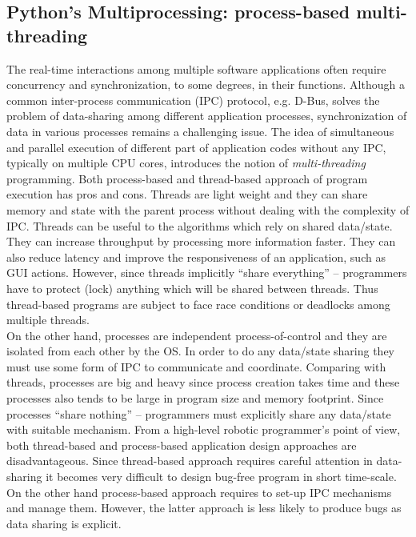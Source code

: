 \subsection{Python's Multiprocessing: process-based multi-threading}
\label{expt-tools:python}
The real-time interactions among multiple software applications often require concurrency and synchronization, to some degrees, in their functions. Although a common inter-process communication (IPC) protocol, e.g. D-Bus, solves the problem of data-sharing among different application processes, synchronization of data in various processes remains a challenging issue.   The idea of simultaneous and parallel execution of different part of application codes without any IPC, typically on  multiple CPU cores, introduces the notion of {\em multi-threading} programming. Both process-based and thread-based approach of  program execution has pros and cons. Threads are light weight and they can share memory and state with the parent process without dealing with the complexity of IPC.   Threads can be useful to the algorithms which rely on shared data/state. They can increase throughput by processing more information faster. They can also reduce latency and improve the responsiveness of an application, such as GUI actions. However, since threads  implicitly ``share everything'' – programmers have to protect (lock) anything which will be
shared between threads. Thus thread-based programs are subject to face race conditions or deadlocks among multiple threads.\\
On the other hand, processes are independent process-of-control and they are isolated from each other by the OS. In order to do any data/state sharing they must use some form of IPC to communicate and coordinate. Comparing with threads, processes are big and heavy since process creation takes time and these processes also tends to be large in program size and memory footprint.  Since processes ``share nothing'' -- programmers must explicitly
 share any data/state with suitable mechanism. From a high-level robotic programmer's point of view, both thread-based and process-based application design approaches are disadvantageous. Since thread-based approach requires careful attention in data-sharing it becomes very difficult to design bug-free program in short time-scale. On the other hand process-based approach requires to set-up IPC mechanisms and manage them. However, the latter approach is less likely to produce bugs as data sharing is explicit.\\ 
